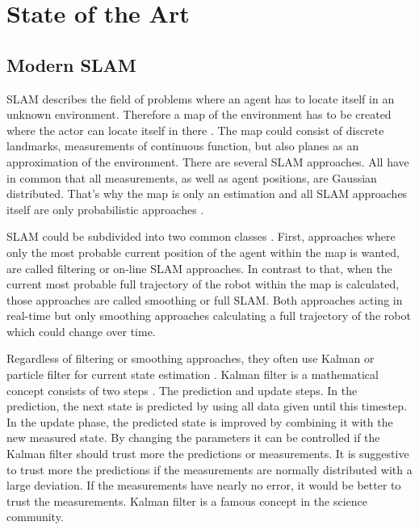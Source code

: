 \label{chap:stat_of_the_art}
\section{State of the Art}

\subsection{Modern SLAM}

SLAM describes the field of problems where an agent has to locate itself in an unknown environment. Therefore a map of the environment has to be created where the actor can locate itself in there \cite{grisetti_tutorial_2010}. The map could consist of discrete landmarks, measurements of continuous function, but also planes as an approximation of the environment. There are several SLAM approaches. All have in common that all measurements, as well as agent positions, are Gaussian distributed. That's why the map is only an estimation and all SLAM approaches itself are only probabilistic approaches \cite{grisetti_tutorial_2010}.

SLAM could be subdivided into two common classes \cite{grisetti_tutorial_2010}. First, approaches where only the most probable current position of the agent within the map is wanted, are called filtering or on-line SLAM approaches. In contrast to that, when the current most probable full trajectory of the robot within the map is calculated, those approaches are called smoothing or full SLAM. Both approaches acting in real-time but only smoothing approaches calculating a full trajectory of the robot which could change over time.

Regardless of filtering or smoothing approaches, they often use Kalman or particle filter for current state estimation \cite{grisetti_tutorial_2010}. Kalman filter is a mathematical concept consists of two steps \cite{kalman1960}. The prediction and update steps. In the prediction, the next state is predicted by using all data given until this timestep. In the update phase, the predicted state is improved by combining it with the new measured state. By changing the parameters it can be controlled if the Kalman filter should trust more the predictions or measurements. It is suggestive to trust more the predictions if the measurements are normally distributed with a large deviation. If the measurements have nearly no error, it would be better to trust the measurements. Kalman filter is a famous concept in the science community. 

